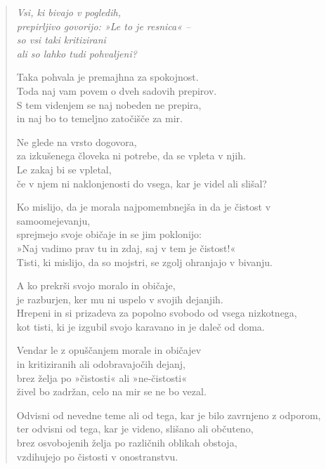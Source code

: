\begin{verse}


\emph{Vsi, ki bivajo v pogledih,}\\
\emph{prepirljivo govorijo: »Le to je resnica« --}\\
\emph{so vsi taki kritizirani}\\
\emph{ali so lahko tudi pohvaljeni?}

Taka pohvala je premajhna za spokojnost.\\
Toda naj vam povem o dveh sadovih prepirov.\\
S tem videnjem se naj nobeden ne prepira,\\
in naj bo to temeljno zatočišče za mir.

Ne glede na vrsto dogovora,\\
za izkušenega človeka ni potrebe, da se vpleta v njih.\\
Le zakaj bi se vpletal,\\
če v njem ni naklonjenosti do vsega, kar je videl ali slišal?

Ko mislijo, da je morala najpomembnejša in da je čistost v samoomejevanju,\\
sprejmejo svoje običaje in se jim poklonijo:\\
»Naj vadimo prav tu in zdaj, saj v tem je čistost!«\\
Tisti, ki mislijo, da so mojstri, se zgolj ohranjajo v bivanju.

A ko prekrši svojo moralo in običaje,\\
je razburjen, ker mu ni uspelo v svojih dejanjih.\\
Hrepeni in si prizadeva za popolno svobodo od vsega nizkotnega,\\
kot tisti, ki je izgubil svojo karavano in je daleč od doma.

Vendar le z opuščanjem morale in običajev\\
in kritiziranih ali odobravajočih dejanj,\\
brez želja po »čistosti« ali »ne-čistosti«\\
živel bo zadržan, celo na mir se ne bo vezal.

Odvisni od nevedne teme ali od tega, kar je bilo zavrnjeno z odporom,\\
ter odvisni od tega, kar je videno, slišano ali občuteno,\\
brez osvobojenih želja po različnih oblikah obstoja,\\
vzdihujejo po čistosti v onostranstvu.


\end{verse}
